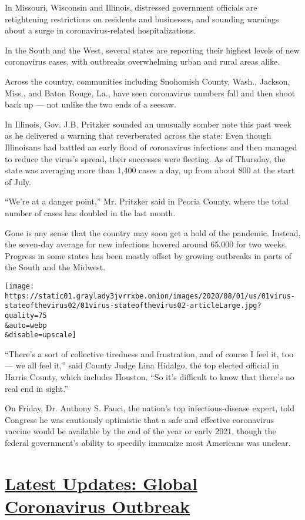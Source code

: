In Missouri, Wisconsin and Illinois, distressed government officials are
retightening restrictions on residents and businesses, and sounding
warnings about a surge in coronavirus-related hospitalizations.

In the South and the West, several states are reporting their highest
levels of new coronavirus cases, with outbreaks overwhelming urban and
rural areas alike.

Across the country, communities including Snohomish County, Wash.,
Jackson, Miss., and Baton Rouge, La., have seen coronavirus numbers fall
and then shoot back up --- not unlike the two ends of a seesaw.

In Illinois, Gov. J.B. Pritzker sounded an unusually somber note this
past week as he delivered a warning that reverberated across the state:
Even though Illinoisans had battled an early flood of coronavirus
infections and then managed to reduce the virus's spread, their
successes were fleeting. As of Thursday, the state was averaging more
than 1,400 cases a day, up from about 800 at the start of July.

``We're at a danger point,'' Mr. Pritzker said in Peoria County, where
the total number of cases has doubled in the last month.

Gone is any sense that the country may soon get a hold of the pandemic.
Instead, the seven-day average for new infections hovered around 65,000
for two weeks. Progress in some states has been mostly offset by growing
outbreaks in parts of the South and the Midwest.

\texttt{[image: https://static01.graylady3jvrrxbe.onion/images/2020/08/01/us/01virus-stateofthevirus02/01virus-stateofthevirus02-articleLarge.jpg?quality=75\\\&auto=webp\\\&disable=upscale]}

``There's a sort of collective tiredness and frustration, and of course
I feel it, too --- we all feel it,'' said County Judge Lina Hidalgo, the
top elected official in Harris County, which includes Houston. ``So it's
difficult to know that there's no real end in sight.''

On Friday, Dr. Anthony S. Fauci, the nation's top infectious-disease
expert, told Congress he was cautiously optimistic that a safe and
effective coronavirus vaccine would be available by the end of the year
or early 2021, though the federal government's ability to speedily
immunize most Americans was unclear.

\hypertarget{latest-updates-global-coronavirus-outbreak}{%
\section{\texorpdfstring{\href{https://www.nytimes3xbfgragh.onion/2020/08/01/world/coronavirus-covid-19.html?action=click\&pgtype=Article\&state=default\&region=MAIN_CONTENT_1\&context=storylines_live_updates}{Latest
Updates: Global Coronavirus
Outbreak}}{Latest Updates: Global Coronavirus Outbreak}}\label{latest-updates-global-coronavirus-outbreak}}

